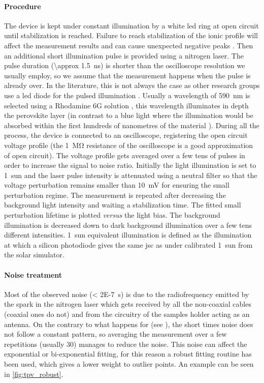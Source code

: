 	\paragraph{Procedure}
	The device is kept under constant illumination by a white \gls{led} ring at open circuit until stabilization is reached.
	Failure to reach stabilization of the ionic profile will affect the measurement results \cite{ORegan2015b} and can cause unexpected negative  peaks \cite{Calado2016}.
	Then an additional short illumination pulse is provided using a nitrogen laser.
	The pulse duration (\SI{\approx 1.5}{\ns}) is shorter than the oscilloscope resolution we usually employ, so we assume that the measurement happens when the pulse is already over.
	In the literature, this is not always the case as other research groups use a \gls{led} diode for the pulsed illumination \cite{Calado2016}.
	Usually a wavelength of \SI{590}{\nm} is selected using a Rhodamine 6G solution \cite{RadiantDyesLaser}, this wavelength illuminates in depth the perovskite layer (in contrast to a blue light where the illumination would be absorbed within the first hundreds of nanometres of the material \cite{Bi2016,Tress2016}).
	During all the process, the device is connected to an oscilloscope, registering the open circuit voltage profile (the \SI{1}{\Mohm} resistance of the oscilloscope is a good approximation of open circuit).
	The voltage profile gets averaged over a few tens of pulses in order to increase the signal to noise ratio.
	Initially the light illumination is set to \SI{1}{sun} and the laser pulse intensity is attenuated using a neutral filter so that the voltage perturbation remains smaller than \SI{10}{\mV} for ensuring the small perturbation regime.
	The measurement is repeated after decreasing the background light intensity and waiting a stabilization time.
	The fitted small perturbation lifetime is plotted \textsl{versus} the light bias.
	The background illumination is decreased down to dark background illumination over a few tens different intensities.
	1~sun equivalent illumination is defined as the illumination at which a silicon photodiode gives the same \gls{jsc} as under calibrated 1~sun from the solar simulator.

	\paragraph{Noise treatment}\label{tpv_robust}
	Most of the observed noise (\SI{< 2E-7}{\s}) is due to the radiofrequency emitted by the spark in the nitrogen laser which gets received by all the non\hyp{}coaxial cables (coaxial ones do not) and from the circuitry of the samples holder acting as an antenna.
	On the contrary to what happens for  (see ), the short times noise does not follow a constant pattern, so averaging the measurement over a few repetitions (usually 30) manages to reduce the noise.
	This noise can affect the exponential or bi\hyp{}exponential fitting, for this reason a robust fitting routine has been used, which gives a lower weight to outlier points.
	An example can be seen in \cref{fig:tpv_robust}.

